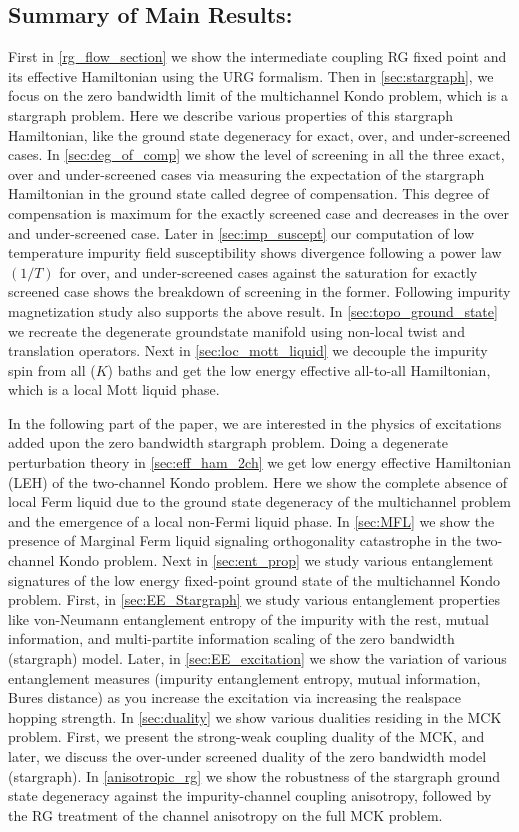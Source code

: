 \documentclass[reprint,prb,superscriptaddress]{revtex4-1}
\begin{document}
\subsection{Summary of Main Results:} 
First in \ref{rg_flow_section} we show the intermediate coupling RG fixed point and its effective Hamiltonian using the URG formalism. Then in \ref{sec:stargraph}, we focus on the zero bandwidth limit of the multichannel Kondo problem, which is a stargraph problem. Here we describe various properties of this stargraph Hamiltonian, like the ground state degeneracy for exact, over, and under-screened cases. In \ref{sec:deg_of_comp} we show the level of screening in all the three exact, over and under-screened cases via measuring the expectation of the stargraph Hamiltonian in the ground state called degree of compensation. This degree of compensation is maximum for the exactly screened case and decreases in the over and under-screened case. Later in \ref{sec:imp_suscept} our computation of low temperature impurity field susceptibility shows divergence following a power law $(1/T)$ for over, and under-screened cases against the saturation for exactly screened case shows the breakdown of screening in the former. Following impurity magnetization study also supports the above result. In \ref{sec:topo_ground_state} we recreate the degenerate groundstate manifold using non-local twist and translation operators. Next in \ref{sec:loc_mott_liquid} we decouple the impurity spin from all ($K$) baths and get the low energy effective all-to-all Hamiltonian, which is a local Mott liquid phase.

\par In the following part of the paper, we are interested in the physics of excitations added upon the zero bandwidth stargraph problem. Doing a degenerate perturbation theory in \ref{sec:eff_ham_2ch} we get low energy effective Hamiltonian (LEH) of the two-channel Kondo problem. Here we show the complete absence of local Ferm liquid due to the ground state degeneracy of the multichannel problem and the emergence of a local non-Fermi liquid phase. In \ref{sec:MFL} we show the presence of Marginal Ferm liquid signaling orthogonality catastrophe in the two-channel Kondo problem. Next in \ref{sec:ent_prop} we study various entanglement signatures of the low energy fixed-point ground state of the multichannel Kondo problem. First, in \ref{sec:EE_Stargraph} we study various entanglement properties like von-Neumann entanglement entropy of the impurity with the rest, mutual information, and multi-partite information scaling of the zero bandwidth (stargraph) model. Later, in \ref{sec:EE_excitation} we show the variation of various entanglement measures (impurity entanglement entropy, mutual information, Bures distance) as you increase the excitation via increasing the realspace hopping strength. In \ref{sec:duality} we show various dualities residing in the MCK problem. First, we present the strong-weak coupling duality of the MCK, and later, we discuss the over-under screened duality of the zero bandwidth model (stargraph). In \ref{anisotropic_rg} we show the robustness of the stargraph ground state degeneracy against the impurity-channel coupling anisotropy, followed by the RG treatment of the channel anisotropy on the full MCK problem.
\end{document}
